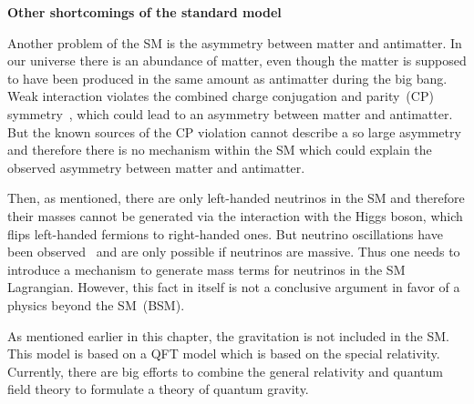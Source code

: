 

\textbf{Other shortcomings of the standard model}

Another problem of the SM is the asymmetry between matter and antimatter. In our universe there is an abundance of matter, even though the matter is supposed to have been produced in the same amount as antimatter during the big bang.  Weak interaction violates the combined charge conjugation and parity~(CP) symmetry~\cite{Kobayashi:1973fv}, which could lead to an asymmetry between matter and antimatter. But the known sources of the CP violation cannot describe a so large asymmetry and therefore there is no mechanism within the SM which could explain the observed asymmetry between matter and antimatter.

Then, as mentioned, there are only left-handed neutrinos in the SM and therefore their masses cannot be generated via the interaction with the Higgs boson, which flips left-handed fermions to right-handed ones. But neutrino oscillations have been observed~\cite{Fukuda:1998mi, Ahmad:2001an} and are only possible if neutrinos are massive. Thus one needs to introduce a mechanism to generate mass terms for neutrinos in the SM Lagrangian. However, this fact in  itself is not a conclusive argument in favor of a physics beyond the SM~(BSM).

As mentioned earlier in this chapter, the gravitation is not included in the SM. This model is based on a QFT model which is based on the special relativity. Currently, there are big efforts to combine the general relativity and quantum field theory to formulate a theory of quantum gravity.  

